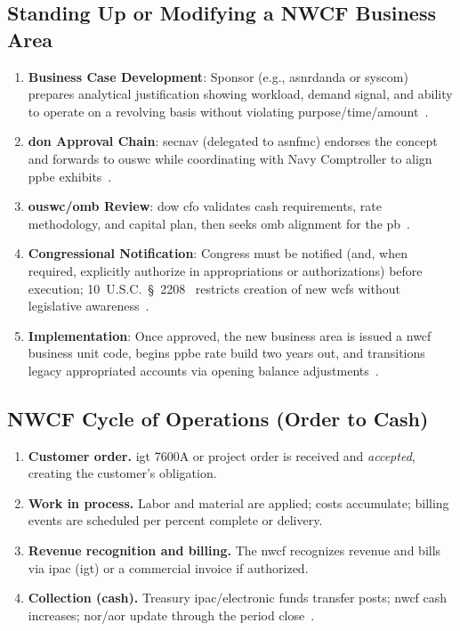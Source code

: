 \documentclass[../main.tex]{subfiles}
\begin{document}
\subsection{Standing Up or Modifying a NWCF Business Area}
\begin{enumerate}
  \item \textbf{Business Case Development}: Sponsor (e.g., \ac{asnrdanda} or \ac{syscom}) prepares analytical justification showing workload, demand signal, and ability to operate on a revolving basis without violating purpose/time/amount~\autocite{DoDFMR-Vol3-Ch19}.
  \item \textbf{\ac{don} Approval Chain}: \ac{secnav} (delegated to \ac{asnfmc}) endorses the concept and forwards to \ac{ouswc} while coordinating with Navy Comptroller to align \ac{ppbe} exhibits~\autocite{DoDFMR-Vol3-Ch19}.
  \item \textbf{\ac{ouswc}/\ac{omb} Review}: \ac{dow} \ac{cfo} validates cash requirements, rate methodology, and capital plan, then seeks \ac{omb} alignment for the \ac{pb}~\autocite{DoDFMR-Vol3-Ch19}.
  \item \textbf{Congressional Notification}: Congress must be notified (and, when required, explicitly authorize in appropriations or authorizations) before execution; 10~U.S.C.~\S~2208~\autocite{USC-2208-NWCF} restricts creation of new \acp{wcf} without legislative awareness~\autocite{DoDFMR-Vol3-Ch19}.
  \item \textbf{Implementation}: Once approved, the new business area is issued a \ac{nwcf} business unit code, begins \ac{ppbe} rate build two years out, and transitions legacy appropriated accounts via opening balance adjustments~\autocite{DoDFMR-Vol3-Ch19}.
\end{enumerate}

\subsection{NWCF Cycle of Operations (Order to Cash)}
\begin{enumerate}
  \item \textbf{Customer order.} \ac{igt} 7600A or project order is received and \emph{accepted}, creating the customer's obligation.
  \item \textbf{Work in process.} Labor and material are applied; costs accumulate; billing events are scheduled per percent complete or delivery.
  \item \textbf{Revenue recognition and billing.} The \ac{nwcf} recognizes revenue and bills via \ac{ipac} (\ac{igt}) or a commercial invoice if authorized.
  \item \textbf{Collection (cash).} Treasury \ac{ipac}/electronic funds transfer posts; \ac{nwcf} cash increases; \ac{nor}/\ac{aor} update through the period close~\autocite{DoDFMR-Vol3,Treasury-GInvoicing}.
\end{enumerate}
\end{document}
